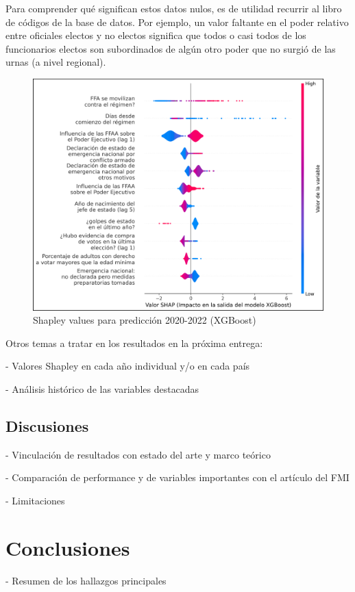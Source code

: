 \documentclass{article}
\begin{document}
Para comprender qué significan estos datos nulos, es de utilidad recurrir al libro de 
códigos de la base de datos. Por ejemplo, un valor faltante en el poder relativo entre 
oficiales electos y no electos significa que todos o casi todos de los funcionarios 
electos son subordinados de algún otro poder que no surgió de las urnas (a nivel
regional).

\begin{figure}[H]
  \centering
  \includegraphics[width=1\textwidth]{10_shapley_values_xgb.png}
  \caption{Shapley values para predicción 2020-2022 (XGBoost)\label{fig:shapley_xgb}}
\end{figure}



Otros temas a tratar en los resultados en la próxima entrega:

- Valores Shapley en cada año individual y/o en cada país

- Análisis histórico de las variables destacadas

\subsection{Discusiones}
- Vinculación de resultados con estado del arte y marco teórico

- Comparación de performance y de variables importantes con el artículo del FMI

- Limitaciones 

\section{Conclusiones}
- Resumen de los hallazgos principales
\end{document}
